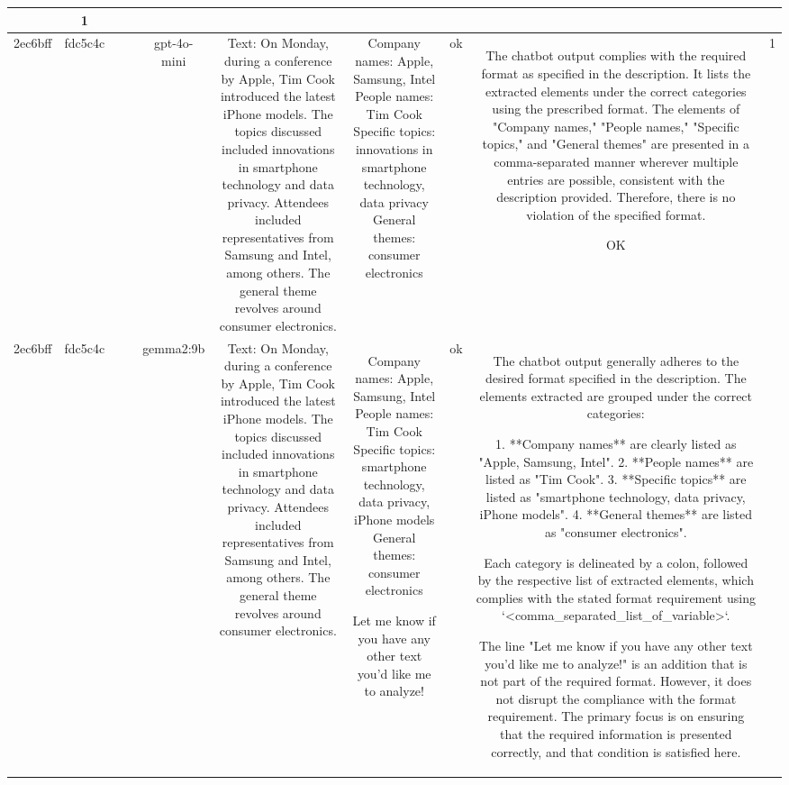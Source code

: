 \begin{table}[h!]
\begin{tabular}{|c|c|c|c|c|c|c|c|c|c|}
{ERR & 1\\
\hline
2ec6bff & fdc5c4c &  &  & gpt-4o-mini & Text: On Monday, during a conference by Apple, Tim Cook introduced the latest iPhone models. The topics discussed included innovations in smartphone technology and data privacy. Attendees included representatives from Samsung and Intel, among others. The general theme revolves around consumer electronics. & Company names: Apple, Samsung, Intel  
People names: Tim Cook  
Specific topics: innovations in smartphone technology, data privacy  
General themes: consumer electronics   & ok & The chatbot output complies with the required format as specified in the description. It lists the extracted elements under the correct categories using the prescribed format. The elements of "Company names," "People names," "Specific topics," and "General themes" are presented in a comma-separated manner wherever multiple entries are possible, consistent with the description provided. Therefore, there is no violation of the specified format.

OK & 1\\
\hline
2ec6bff & fdc5c4c &  &  & gemma2:9b & Text: On Monday, during a conference by Apple, Tim Cook introduced the latest iPhone models. The topics discussed included innovations in smartphone technology and data privacy. Attendees included representatives from Samsung and Intel, among others. The general theme revolves around consumer electronics. & Company names: Apple, Samsung, Intel
People names: Tim Cook 
Specific topics:  smartphone technology, data privacy, iPhone models
General themes: consumer electronics 


Let me know if you have any other text you'd like me to analyze! 
 & ok & The chatbot output generally adheres to the desired format specified in the description. The elements extracted are grouped under the correct categories:

1. **Company names** are clearly listed as "Apple, Samsung, Intel".
2. **People names** are listed as "Tim Cook".
3. **Specific topics** are listed as "smartphone technology, data privacy, iPhone models".
4. **General themes** are listed as "consumer electronics".

Each category is delineated by a colon, followed by the respective list of extracted elements, which complies with the stated format requirement using `<comma_separated_list_of_variable>`.

The line "Let me know if you have any other text you'd like me to analyze!" is an addition that is not part of the required format. However, it does not disrupt the compliance with the format requirement. The primary focus is on ensuring that the required information is presented correctly, and that condition is satisfied here. 

}
\end{tabular}
\end{table}
